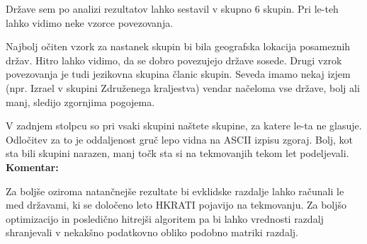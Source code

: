 \documentclass[a4paper,11pt]{article}
\begin{document}

Države sem po analizi rezultatov lahko sestavil v skupno 6 skupin. Pri le-teh lahko vidimo neke vzorce povezovanja.

Najbolj očiten vzork za nastanek skupin bi bila geografska lokacija posameznih držav. Hitro lahko vidimo, da se dobro
povezujejo države sosede. Drugi vzrok povezovanja je tudi jezikovna skupina članic skupin. Seveda imamo nekaj izjem
(npr. Izrael v skupini Združenega kraljestva) vendar načeloma vse države, bolj ali manj, sledijo zgornjima pogojema.

V zadnjem stolpcu so pri vsaki skupini naštete skupine, za katere le-ta ne glasuje. Odločitev za to je oddaljenost gruč
lepo vidna na ASCII izpisu zgoraj. Bolj, kot sta bili skupini narazen, manj točk sta si na tekmovanjih tekom let podeljevali.
\\
\textbf{Komentar:}


    Za boljše oziroma natančnejše rezultate bi evklidske razdalje lahko računali le med državami, ki se določeno leto HKRATI
    pojavijo na tekmovanju. Za boljšo optimizacijo in posledično hitrejši algoritem pa bi lahko vrednosti razdalj shranjevali
    v nekakšno podatkovno obliko podobno matriki razdalj.
\end{document}
